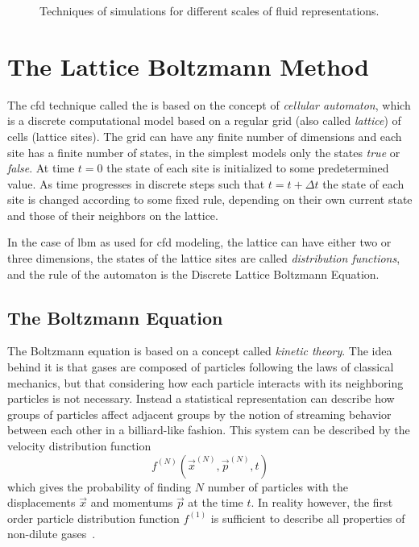 \begin{figure}[H]
\centering
\begin{small}
\def\svgwidth{1.0\linewidth}

\end{small}
\caption{Techniques of simulations for different scales of fluid representations.}
\label{fig:scales}
\end{figure}

\section{The Lattice Boltzmann Method}\label{sec:lbm}
The \gls{cfd} technique called the  is based on the concept of \textit{cellular automaton}, which is a discrete computational model based on a regular grid (also called \textit{lattice}) of cells (lattice sites). The grid can have any finite number of dimensions and each site has a finite number of states, in the simplest models only the states \textit{true} or \textit{false}. At time $t=0$ the state of each site is initialized to some predetermined value. As time progresses in discrete steps such that $t=t+\Delta t$ the state of each site is changed according to some fixed rule, depending on their own current state and those of their neighbors on the lattice.

In the case of \gls{lbm} as used for \gls{cfd} modeling, the lattice can have either two or three dimensions, the states of the lattice sites are called \textit{distribution functions}, and the rule of the automaton is the Discrete Lattice Boltzmann Equation.

\subsection{The Boltzmann Equation}
The Boltzmann equation is based on a concept called \textit{kinetic theory}. The idea behind it is that gases are composed of particles following the laws of classical mechanics, but that considering how each particle interacts with its neighboring particles is not necessary. Instead a statistical representation can describe how groups of particles affect adjacent groups by the notion of streaming behavior between each other in a billiard-like fashion. This system can be described by the velocity distribution function 
\begin{equation}
f^{(N)}(\vec{x}^{(N)}, \vec{p}^{(N)}, t)
\end{equation}
which gives the probability of finding $N$ number of particles with the displacements $\vec{x}$ and momentums  $\vec{p}$ at the time $t$. In reality however, the first order particle distribution function $f^{(1)}$ is sufficient to describe all properties of non-dilute gases~\cites[pg.28]{lbm2}. 

